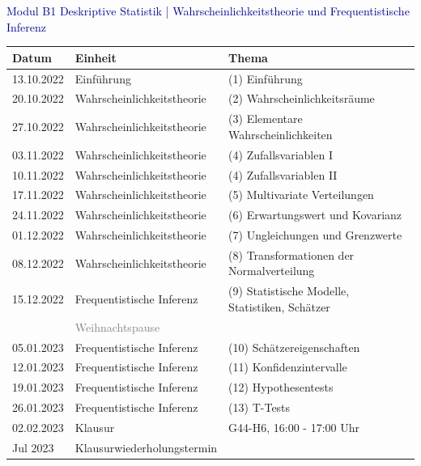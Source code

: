 \documentclass[
  8pt,
  ignorenonframetext,
]{beamer}
\begin{document}
\begin{frame}{}
\protect\hypertarget{section-2}{}
\vspace{1mm}

\textcolor{darkblue}{Modul B1 Deskriptive Statistik | Wahrscheinlichkeitstheorie und Frequentistische Inferenz}
\vspace{1mm}

\small
\center
\footnotesize
\renewcommand{\arraystretch}{1.1}
\begin{tabular}{lll}
Datum        & Einheit                       & Thema                                                \\\hline
13.10.2022   & Einführung                    & (1) Einführung                                       \\
20.10.2022   & Wahrscheinlichkeitstheorie    & (2) Wahrscheinlichkeitsräume                         \\
27.10.2022   & Wahrscheinlichkeitstheorie    & (3) Elementare Wahrscheinlichkeiten                  \\
03.11.2022   & Wahrscheinlichkeitstheorie    & (4) Zufallsvariablen I                               \\
10.11.2022   & Wahrscheinlichkeitstheorie    & (4) Zufallsvariablen II                              \\
17.11.2022   & Wahrscheinlichkeitstheorie    & (5) Multivariate Verteilungen                        \\
24.11.2022   & Wahrscheinlichkeitstheorie    & (6) Erwartungswert und Kovarianz                     \\
01.12.2022   & Wahrscheinlichkeitstheorie    & (7) Ungleichungen und Grenzwerte                     \\
08.12.2022   & Wahrscheinlichkeitstheorie    & (8) Transformationen der Normalverteilung            \\
15.12.2022   & Frequentistische Inferenz     & (9) Statistische Modelle, Statistiken, Schätzer      \\
             & \textcolor{gray}{Weihnachtspause}                                                    \\
05.01.2023   & Frequentistische Inferenz     & (10) Schätzereigenschaften                           \\
12.01.2023   & Frequentistische Inferenz     & (11) Konfidenzintervalle                             \\
19.01.2023   & Frequentistische Inferenz     & (12) Hypothesentests                                 \\
26.01.2023   & Frequentistische Inferenz     & (13) T-Tests                                         \\\hline
02.02.2023   & Klausur                       & G44-H6, 16:00 - 17:00 Uhr                            \\
Jul 2023     & Klausurwiederholungstermin    &
\end{tabular}
\end{frame}
\end{document}
